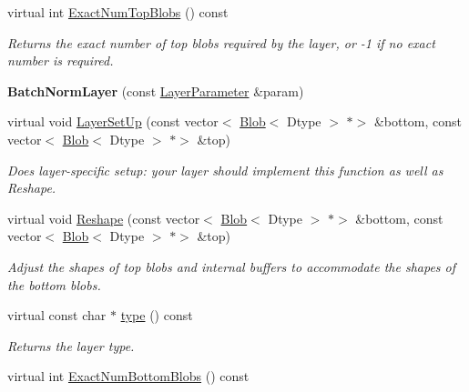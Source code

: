 \begin{DoxyCompactItemize}
virtual int \mbox{\hyperlink{classcaffe_1_1_batch_norm_layer_ab8575decdd0c5c42e24b9c3424f708ad}{Exact\+Num\+Top\+Blobs}} () const
\begin{DoxyCompactList}\small\item\em Returns the exact number of top blobs required by the layer, or -\/1 if no exact number is required. \end{DoxyCompactList}\item 
\mbox{\label{classcaffe_1_1_batch_norm_layer_add0e20ed67cad3052669765cda52a7f0}} 
{\bfseries Batch\+Norm\+Layer} (const \mbox{\hyperlink{classcaffe_1_1_layer_parameter}{Layer\+Parameter}} \&param)
\item 
virtual void \mbox{\hyperlink{classcaffe_1_1_batch_norm_layer_a01e75b47ce076569ed09e08618c5be7c}{Layer\+Set\+Up}} (const vector$<$ \mbox{\hyperlink{classcaffe_1_1_blob}{Blob}}$<$ Dtype $>$ $\ast$$>$ \&bottom, const vector$<$ \mbox{\hyperlink{classcaffe_1_1_blob}{Blob}}$<$ Dtype $>$ $\ast$$>$ \&top)
\begin{DoxyCompactList}\small\item\em Does layer-\/specific setup\+: your layer should implement this function as well as Reshape. \end{DoxyCompactList}\item 
virtual void \mbox{\hyperlink{classcaffe_1_1_batch_norm_layer_ab5cc20592aaa28fb2c41fabe842da3fc}{Reshape}} (const vector$<$ \mbox{\hyperlink{classcaffe_1_1_blob}{Blob}}$<$ Dtype $>$ $\ast$$>$ \&bottom, const vector$<$ \mbox{\hyperlink{classcaffe_1_1_blob}{Blob}}$<$ Dtype $>$ $\ast$$>$ \&top)
\begin{DoxyCompactList}\small\item\em Adjust the shapes of top blobs and internal buffers to accommodate the shapes of the bottom blobs. \end{DoxyCompactList}\item 
\mbox{\label{classcaffe_1_1_batch_norm_layer_a58c9860015d3527ba1df35520a9d9cfc}} 
virtual const char $\ast$ \mbox{\hyperlink{classcaffe_1_1_batch_norm_layer_a58c9860015d3527ba1df35520a9d9cfc}{type}} () const
\begin{DoxyCompactList}\small\item\em Returns the layer type. \end{DoxyCompactList}\item 
virtual int \mbox{\hyperlink{classcaffe_1_1_batch_norm_layer_a5b87980f25eea544ebff916586c870e6}{Exact\+Num\+Bottom\+Blobs}} () const

\end{DoxyCompactItemize}

